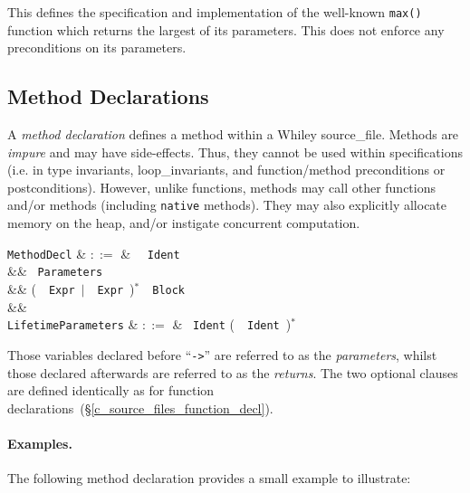 

This defines the specification and implementation of the well-known \lstinline{max()} function which returns the largest of its parameters. This does not enforce any preconditions on its parameters.


\subsection{Method Declarations}
\label{c_source_files_method_decl}

A {\em method declaration} defines a method within a Whiley \gls{source_file}.  Methods are {\em impure} and may have side-effects.  Thus, they cannot be used within specifications (i.e. in type invariants, \gls{loop_invariant}s, and function/method \gls{precondition}s or \gls{postcondition}s).  However, unlike functions, methods may call other functions and/or methods (including \lstinline{native} methods).  They may also explicitly allocate memory on the heap, and/or instigate concurrent computation.

\begin{syntax}
  \verb+MethodDecl+ & $::=$ & \ \ \verb+Ident+\\
  && \token{(}\ \verb+Parameters+\ \token{)}\ \\
  && \big(\ \ \verb+Expr+\ $|$\ \ \verb+Expr+\ \big)$^*$\ \token{:}\ \verb+Block+\\
  &&\\
  \verb+LifetimeParameters+ & $::=$ & \token{<}\ \verb+Ident+ \big(\ \token{,}\ \verb+Ident+\ \big)$^*$\ \token{>}\\
\end{syntax}

Those variables declared before ``\lstinline{->}'' are referred to as the {\em parameters}, whilst those declared afterwards are referred to as the {\em returns}.  The two optional clauses are defined identically as for function declarations~(\S\ref{c_source_files_function_decl}).

\paragraph{Examples.}  The following method declaration provides a
small example to illustrate:






